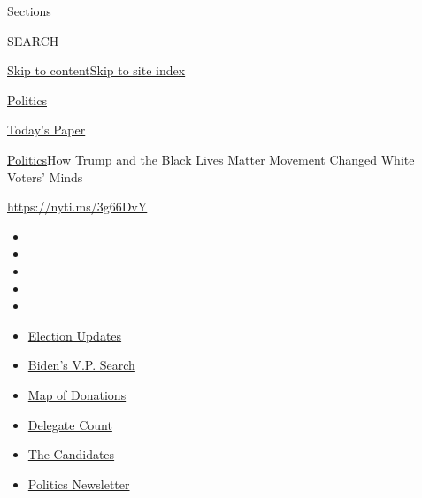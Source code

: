 Sections

SEARCH

\protect\hyperlink{site-content}{Skip to
content}\protect\hyperlink{site-index}{Skip to site index}

\href{https://www.nytimes.com/section/politics}{Politics}

\href{https://myaccount.nytimes.com/auth/login?response_type=cookie\&client_id=vi}{}

\href{https://www.nytimes.com/section/todayspaper}{Today's Paper}

\href{/section/politics}{Politics}\textbar{}How Trump and the Black
Lives Matter Movement Changed White Voters' Minds

\url{https://nyti.ms/3g66DvY}

\begin{itemize}
\item
\item
\item
\item
\item
\end{itemize}

\begin{itemize}
\item
  \href{https://www.nytimes.com/2020/07/31/us/elections/biden-vs-trump.html?action=click\&pgtype=Article\&state=default\&region=TOP_BANNER\&context=storylines_menu}{Election
  Updates}
\item
  \href{https://www.nytimes.com/article/biden-vice-president-2020.html?action=click\&pgtype=Article\&state=default\&region=TOP_BANNER\&context=storylines_menu}{Biden's
  V.P. Search}
\item
  \href{https://www.nytimes.com/interactive/2020/07/24/us/politics/trump-biden-campaign-donors.html?action=click\&pgtype=Article\&state=default\&region=TOP_BANNER\&context=storylines_menu}{Map
  of Donations}
\item
  \href{https://www.nytimes.com/interactive/2020/us/elections/delegate-count-primary-results.html?action=click\&pgtype=Article\&state=default\&region=TOP_BANNER\&context=storylines_menu}{Delegate
  Count}
\item
  \href{https://www.nytimes.com/interactive/2019/us/politics/2020-presidential-candidates.html?action=click\&pgtype=Article\&state=default\&region=TOP_BANNER\&context=storylines_menu}{The
  Candidates}
\item
  \href{https://www.nytimes.com/newsletters/politics?action=click\&pgtype=Article\&state=default\&region=TOP_BANNER\&context=storylines_menu}{Politics
  Newsletter}
\end{itemize}


